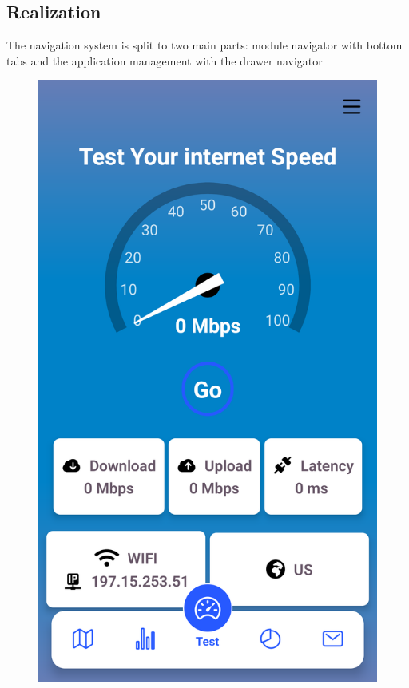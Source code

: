 \subsection{Realization}
The navigation system is split to two main parts: module navigator with bottom tabs and the application management with the drawer navigator
\begin{figure}[H]
\begin{minipage}{0.3\textwidth}
    \centering
    \includegraphics[width=\linewidth]{images/chap2/nav1.png}

\end{minipage}
\end{figure}
